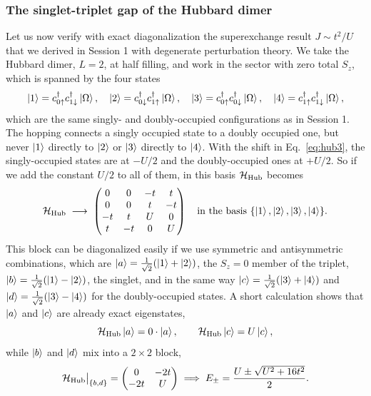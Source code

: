 \documentclass[lecture_notes.tex]{subfiles}
\begin{document}
\subsubsection{The singlet-triplet gap of the Hubbard dimer}
Let us now verify with exact diagonalization the superexchange result $J \sim t^2/U$ that we
derived in Session 1 with degenerate perturbation theory. We take the Hubbard dimer, $L=2$, at half
filling, and work in the sector with zero total $S_z$, which is spanned by the four states
\begin{equation}
  \ket{1} = c^{\dagger}_{0\uparrow}c^{\dagger}_{1\downarrow}\ket{\Omega}, \quad
  \ket{2} = c^{\dagger}_{0\downarrow}c^{\dagger}_{1\uparrow}\ket{\Omega}, \quad
  \ket{3} = c^{\dagger}_{0\uparrow}c^{\dagger}_{0\downarrow}\ket{\Omega}, \quad
  \ket{4} = c^{\dagger}_{1\uparrow}c^{\dagger}_{1\downarrow}\ket{\Omega},
\end{equation}
which are the same singly- and doubly-occupied configurations as in Session 1. The hopping
connects a singly occupied state to a doubly occupied one, but never $\ket{1}$ directly to
$\ket{2}$ or $\ket{3}$ directly to $\ket{4}$. With the shift in Eq.~\eqref{eq:hub3}, the
singly-occupied states are at $-U/2$ and the doubly-occupied ones at $+U/2$. So if we add the
constant $U/2$ to all of them, in this basis $\mathcal{H}_{\mathrm{Hub}}$ becomes
\begin{equation}
  \mathcal{H}_{\mathrm{Hub}} \;\longrightarrow\;
  \begin{pmatrix} 0 & 0 & -t & t \\ 0 & 0 & t & -t \\ -t & t & U & 0 \\ t & -t & 0 & U\end{pmatrix}
  \quad\text{in the basis } \{\ket1,\ket2,\ket3,\ket4\}.
\end{equation}
This block can be diagonalized easily if we use symmetric and antisymmetric combinations, which are
$\ket{a}=\tfrac1{\sqrt2}(\ket1+\ket2)$, the $S_z=0$ member of the triplet, $\ket{b}=
\tfrac1{\sqrt2}(\ket1-\ket2)$, the singlet, and in the same way $\ket{c}=\tfrac1{\sqrt2}(\ket3+\ket4)$
and $\ket{d}=\tfrac1{\sqrt2}(\ket3-\ket4)$ for the doubly-occupied states. A short calculation
shows that $\ket{a}$ and $\ket{c}$ are already exact eigenstates,
\begin{equation}
  \mathcal{H}_{\mathrm{Hub}}\ket{a} = 0\cdot\ket{a}, \qquad \mathcal{H}_{\mathrm{Hub}}\ket{c} = U\ket{c},
\end{equation}
while $\ket{b}$ and $\ket{d}$ mix into a $2\times2$ block,
\begin{equation}
  \mathcal{H}_{\mathrm{Hub}}\big|_{\{b,d\}} = \begin{pmatrix} 0 & -2t \\ -2t & U\end{pmatrix}
  \;\Longrightarrow\;
  E_\pm = \frac{U \pm \sqrt{U^2 + 16t^2}}2.
\end{equation}
\end{document}
